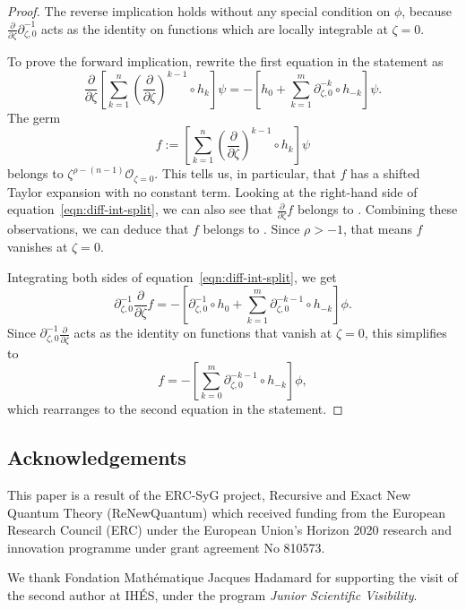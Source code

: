 \documentclass[10pt,a4paper]{amsart}
\newcommand{\fracderiv}[3]{\partial^{#1}_{#2, #3}}
\numberwithin{equation}{section}
\begin{document}
\begin{proof}
The reverse implication holds without any special condition on $\phi$, because $\frac{\partial}{\partial \zeta} \fracderiv{-1}{\zeta}{0}$ acts as the identity on functions which are locally integrable at $\zeta = 0$.

To prove the forward implication, rewrite the first equation in the statement as
\begin{equation}\label{eqn:diff-int-split}
\frac{\partial}{\partial \zeta} \left[ \sum_{k = 1}^n \left(\frac{\partial}{\partial \zeta}\right)^{k-1} \circ h_k \right] \psi = -\left[ h_0 + \sum_{k = 1}^m \fracderiv{-k}{\zeta}{0} \circ h_{-k} \right] \psi.
\end{equation}
The germ
\[ f := \left[ \sum_{k = 1}^n \left(\frac{\partial}{\partial \zeta}\right)^{k-1} \circ h_k \right] \psi \]
belongs to $\zeta^{\rho-(n-1)} \mathcal{O}_{\zeta = 0}$. This tells us, in particular, that $f$ has a shifted Taylor expansion with no constant term. Looking at the right-hand side of equation~\eqref{eqn:diff-int-split}, we can also see that $\frac{\partial}{\partial \zeta} f$ belongs to . Combining these observations, we can deduce that $f$ belongs to . Since $\rho > -1$, that means $f$ vanishes at $\zeta = 0$.

Integrating both sides of equation~\eqref{eqn:diff-int-split}, we get
\[ \fracderiv{-1}{\zeta}{0} \frac{\partial}{\partial \zeta} f = -\left[ \fracderiv{-1}{\zeta}{0} \circ h_0 + \sum_{k = 1}^m \fracderiv{-k-1}{\zeta}{0} \circ h_{-k} \right] \phi. \]
Since $\fracderiv{-1}{\zeta}{0} \frac{\partial}{\partial \zeta}$ acts as the identity on functions that vanish at $\zeta = 0$, this simplifies to
\[ f = -\left[ \sum_{k = 0}^m \fracderiv{-k-1}{\zeta}{0} \circ h_{-k} \right] \phi, \]
which rearranges to the second equation in the statement.
\end{proof}


\subsection*{Acknowledgements}
This paper is a result of the ERC-SyG project, Recursive and Exact New Quantum Theory (ReNewQuantum) which received funding from the European Research Council (ERC) under the European Union's Horizon 2020 research and innovation programme under grant agreement No 810573.

We thank Fondation Math\'ematique Jacques Hadamard for supporting the visit of the second author at IH\'{E}S, under the program \textit{Junior Scientific Visibility}.
\end{document}
